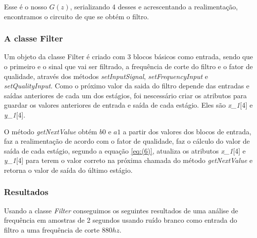 \documentclass{article}
\begin{document}
Esse é o nosso $G(z)$, serializando 4 desses e acrescentando a realimentação, encontramos o circuito de que se obtém o filtro.


\subsubsection{A classe Filter}
Um objeto da classe Filter é criado com 
3 blocos básicos como entrada, sendo que o primeiro e o sinal que vai ser filtrado, a frequência de corte do filtro e o fator de qualidade, através dos
métodos \emph{setInputSignal}, \emph{setFrequencyInput} e \emph{setQualityInput}.
Como o próximo valor da saida do filtro depende das entradas e saídas anteriores de cada um dos estágios, foi nescessário criar os atributos
 para guardar os valores anteriores de entrada e saída de cada estágio. Eles são \emph{x\_1}[4] e \emph{y\_1}[4]. 


O método \emph{getNextValue} obtém $b0$ e $a1$ a partir dos valores dos blocos de entrada, faz a realimentação de acordo com o fator de qualidade, 
 faz o cálculo do valor de saída de cada estágio, segundo a equação \ref{eq:(6)}, atualiza os atributos \emph{x\_1}[4] e \emph{y\_1}[4] para terem o valor correto
 na próxima chamada do método \emph{getNextValue} e retorna o valor de saída do último estágio.

\subsubsection{Resultados}


Usando a classe \emph{Filter} conseguimos os seguintes resultados de uma análise de frequência em amostras de 2 segundos usando ruído branco como entrada do filtro a uma frequência
 de corte $880 hz$.
\end{document}
